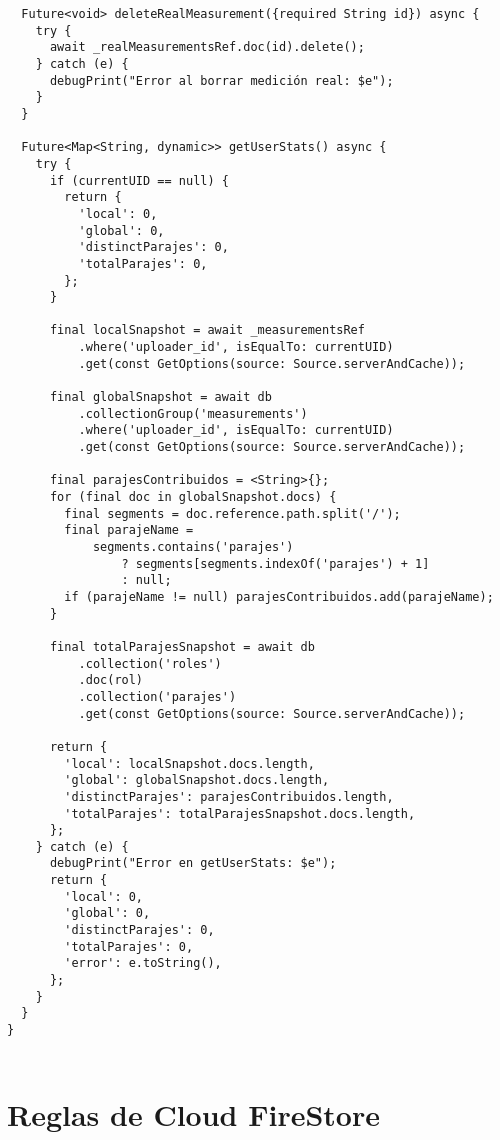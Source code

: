 \begin{verbatim}
  Future<void> deleteRealMeasurement({required String id}) async {
    try {
      await _realMeasurementsRef.doc(id).delete(); 
    } catch (e) {
      debugPrint("Error al borrar medición real: $e");
    }
  }

  Future<Map<String, dynamic>> getUserStats() async {
    try {
      if (currentUID == null) {
        return {
          'local': 0,
          'global': 0,
          'distinctParajes': 0,
          'totalParajes': 0,
        };
      }

      final localSnapshot = await _measurementsRef
          .where('uploader_id', isEqualTo: currentUID)
          .get(const GetOptions(source: Source.serverAndCache));

      final globalSnapshot = await db
          .collectionGroup('measurements')
          .where('uploader_id', isEqualTo: currentUID)
          .get(const GetOptions(source: Source.serverAndCache));

      final parajesContribuidos = <String>{};
      for (final doc in globalSnapshot.docs) {
        final segments = doc.reference.path.split('/');
        final parajeName =
            segments.contains('parajes')
                ? segments[segments.indexOf('parajes') + 1]
                : null;
        if (parajeName != null) parajesContribuidos.add(parajeName);
      }

      final totalParajesSnapshot = await db
          .collection('roles')
          .doc(rol)
          .collection('parajes')
          .get(const GetOptions(source: Source.serverAndCache));

      return {
        'local': localSnapshot.docs.length,
        'global': globalSnapshot.docs.length,
        'distinctParajes': parajesContribuidos.length,
        'totalParajes': totalParajesSnapshot.docs.length,
      };
    } catch (e) {
      debugPrint("Error en getUserStats: $e");
      return {
        'local': 0,
        'global': 0,
        'distinctParajes': 0,
        'totalParajes': 0,
        'error': e.toString(),
      };
    }
  }
}


        \end{verbatim}


\newpage
\section{Reglas de Cloud FireStore}
\label{anexo:alg2}

